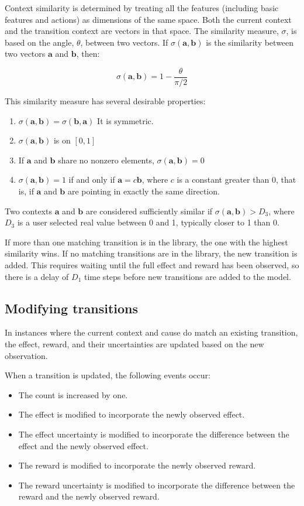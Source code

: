 Context similarity is determined by treating all the features (including basic features and actions) as dimensions of the same space. Both the current context and the transition context are vectors in that space. The similarity measure, $\sigma$, is based on the angle, $\theta$, between two vectors. If $\sigma(\mathbf{a},\mathbf{b})$ is the similarity between two vectors $\mathbf{a}$ and $\mathbf{b}$, then:

\begin{equation}    
\sigma(\mathbf{a},\mathbf{b}) = 1 - \frac{\theta}{\pi/2}
\label{similarity}
\end{equation}

This similarity measure has several desirable properties:
\begin{enumerate}
\item $\sigma(\mathbf{a},\mathbf{b}) = \sigma(\mathbf{b},\mathbf{a})$ It is symmetric.
\item $\sigma(\mathbf{a},\mathbf{b})$ is on $[0,1]$
\item If $\mathbf{a}$ and $\mathbf{b}$ share no nonzero elements, $\sigma(\mathbf{a},\mathbf{b}) = 0$
\item $\sigma(\mathbf{a},\mathbf{b}) = 1$ if and only if $\mathbf{a} = c \mathbf{b}$, where $c$ is a constant greater than 0, that is, if $\mathbf{a}$ and $\mathbf{b}$ are pointing in exactly the same direction.
\end{enumerate}

Two contexts $\mathbf{a}$ and $\mathbf{b}$ are considered sufficiently similar if $\sigma(\mathbf{a},\mathbf{b}) > D_3$, where $D_3$ is a user selected real value between 0 and 1, typically closer to 1 than 0.

If more than one matching transition is in the library, the one with the highest similarity wins. If no matching transitions are in the library, the new transition is added. This requires waiting until the full effect and reward has been observed, so there is a delay of $D_1$ time steps before new transitions are added to the model.

\subsection{Modifying transitions}
In instances where the current context and cause do match an existing transition, the effect, reward, and their uncertainties are updated based on the new observation.

When a transition is updated, the following events occur:
\begin{itemize}
\item The count is increased by one.
\item The effect is modified to incorporate the newly observed effect.
\item The effect uncertainty is modified to incorporate the difference between the effect and the newly observed effect.
\item The reward is modified to incorporate the newly observed reward.
\item The reward uncertainty is modified to incorporate the difference between the reward and the newly observed reward.
\end{itemize}

